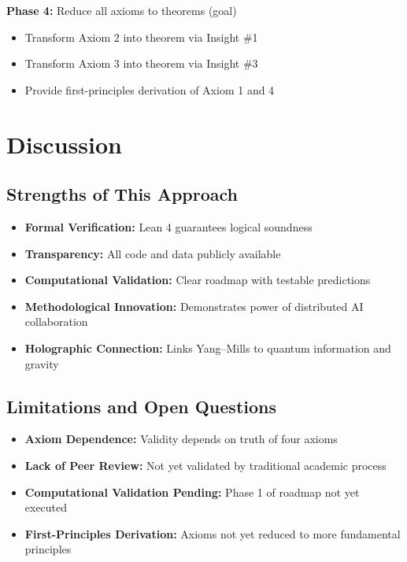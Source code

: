 \documentclass[11pt]{article}
\theoremstyle{definition}
\theoremstyle{remark}
\begin{document}
\textbf{Phase 4:} Reduce all axioms to theorems (goal)
\begin{itemize}
\item Transform Axiom 2 into theorem via Insight \#1
\item Transform Axiom 3 into theorem via Insight \#3
\item Provide first-principles derivation of Axiom 1 and 4
\end{itemize}

\section{Discussion}

\subsection{Strengths of This Approach}

\begin{itemize}
\item \textbf{Formal Verification:} Lean 4 guarantees logical soundness
\item \textbf{Transparency:} All code and data publicly available
\item \textbf{Computational Validation:} Clear roadmap with testable predictions
\item \textbf{Methodological Innovation:} Demonstrates power of distributed AI collaboration
\item \textbf{Holographic Connection:} Links Yang--Mills to quantum information and gravity
\end{itemize}

\subsection{Limitations and Open Questions}

\begin{itemize}
\item \textbf{Axiom Dependence:} Validity depends on truth of four axioms
\item \textbf{Lack of Peer Review:} Not yet validated by traditional academic process
\item \textbf{Computational Validation Pending:} Phase 1 of roadmap not yet executed
\item \textbf{First-Principles Derivation:} Axioms not yet reduced to more fundamental principles
\end{itemize}
\end{document}

